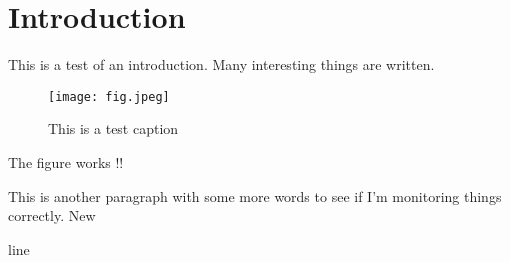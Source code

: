 \chapter{Introduction}
\label{ch:intro}

This is a test of an introduction. Many interesting things are written.

\begin{figure}[h]
	\centering
	\texttt{[image: fig.jpeg]}
	\caption{This is a test caption}
	\label{fig:testfig}
\end{figure}

The figure works !! \cite{feynman2018space}

This is another paragraph with some more words to see if I'm monitoring things correctly. New

line
